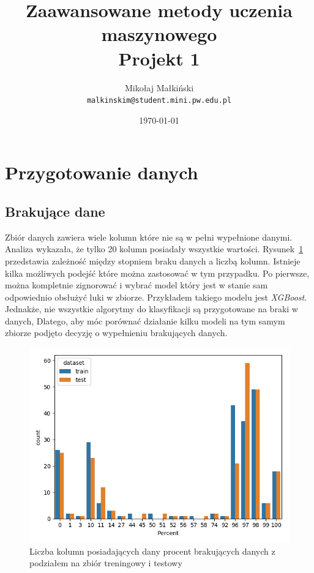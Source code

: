 \documentclass[a4paper,12pt]{article}
\title{
Zaawansowane metody uczenia maszynowego \\
Projekt 1
}
\author{
Mikołaj Małkiński \\
\texttt{malkinskim@student.mini.pw.edu.pl}
}
\date{\today}
\begin{document}
    \maketitle

    \section{Przygotowanie danych}

    \subsection{Brakujące dane}
    Zbiór danych zawiera wiele kolumn które nie są w pełni wypełnione danymi.
    Analiza wykazała, że tylko 20 kolumn posiadały wszystkie wartości.
    Rysunek~\ref{fig:missing-data} przedstawia zależność między stopniem braku danych a liczbą kolumn.
    Istnieje kilka możliwych podejść które można zastosować w tym przypadku.
    Po pierwsze, można kompletnie zignorować i wybrać model który jest w stanie sam odpowiednio obsłużyć luki w zbiorze.
    Przykładem takiego modelu jest \textit{XGBoost}.
    Jednakże, nie wszystkie algorytmy do klasyfikacji są przygotowane na braki w danych,
    Dlatego, aby móc porównać działanie kilku modeli na tym samym zbiorze podjęto decyzję o wypełnieniu brakujących danych.

    \begin{figure}
        \centering
        \includegraphics[width=\linewidth]{../images/missing-data.png}
        \caption{Liczba kolumn posiadających dany procent brakujących danych z podziałem na zbiór treningowy i testowy}
        \label{fig:missing-data}
    \end{figure}
\end{document}
